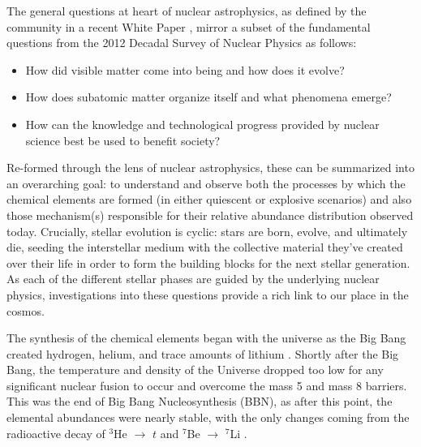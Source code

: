 The general questions at heart of nuclear astrophysics, as defined by the community in a recent White Paper \cite{Riley2017}, mirror a subset of the fundamental questions from the 2012 Decadal Survey of Nuclear Physics \cite{nrc2013} as follows:

\begin{itemize}
\item How did visible matter come into being and how does it evolve?
\item How does subatomic matter organize itself and what phenomena emerge?
\item How can the knowledge and technological progress provided by nuclear science best be used to benefit society?
\end{itemize}

\noindent Re-formed through the lens of nuclear astrophysics, these can be summarized into an overarching goal: to understand and observe both the processes by which the chemical elements are formed (in either quiescent or explosive scenarios) and also those mechanism(s) responsible for their relative abundance distribution observed today. Crucially, stellar evolution is cyclic: stars are born, evolve, and ultimately die, seeding the interstellar medium with the collective material they've created over their life in order to form the building blocks for the next stellar generation. As each of the different stellar phases are guided by the underlying nuclear physics, investigations into these questions provide a rich link to our place in the cosmos. 

The synthesis of the chemical elements began with the universe as the Big Bang created hydrogen, helium, and trace amounts of lithium \cite{Alpher1948}. Shortly after the Big Bang, the temperature and density of the Universe dropped too low for any significant nuclear fusion to occur and overcome the mass 5 and mass 8 barriers. This was the end of Big Bang Nucleosynthesis (BBN), as after this point, the elemental abundances were nearly stable, with the only changes coming from the radioactive decay of $^{3}$He $\rightarrow$ $t$ and $^{7}$Be $\rightarrow$ $^{7}$Li \cite{Fields2011}.

